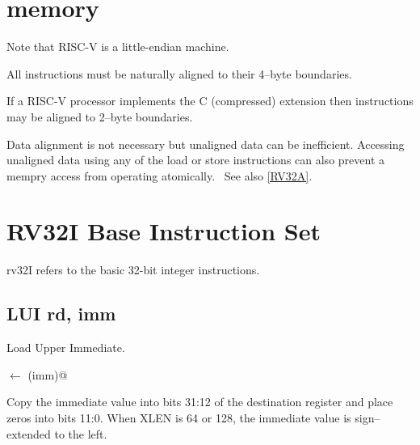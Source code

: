 \section{memory}

Note that RISC-V is a little-endian machine.  

All instructions must be naturally aligned to their 4--byte 
boundaries.~\cite[p.~5]{rvismv1v22:2017}

If a RISC-V processor implements the C (compressed) extension then 
instructions may be aligned to 2--byte 
boundaries.\cite[p.~68]{rvismv1v22:2017}

Data alignment is not necessary but unaligned data can be inefficient.  
Accessing unaligned data using any of the load or store instructions can 
also prevent a mempry access from operating 
atomically.~\cite[p.19]{rvismv1v22:2017}  See also \autoref{RV32A}.



\section{RV32I Base Instruction Set}

\Gls{rv32}I refers to the basic 32-bit integer instructions.

\subsection{LUI rd, imm}

Load Upper Immediate.

\verb@rd@ $\leftarrow$ \verb@zr(imm)@

Copy the immediate value into bits 31:12 of the destination register and
place zeros into bits 11:0.
When XLEN is 64 or 128, the immediate value is sign--extended to the left.

